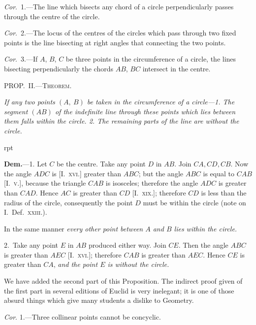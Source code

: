 \documentclass[oneside]{book}
\newcounter{wrapwidth}
\newcommand\mypropl[2]{
\bigskip\Needspace*{4\baselineskip}\begin{center}\textsc{#1}\end{center}
\hspace{\parindent}\emph{#2}\par\medskip
}
\newcommand\imgflow[3]{
\setcounter{wrapwidth}{#1}

\begin{wrapfigure}[#2]{r}{\value{wrapwidth}pt}
\begin{center}
\vspace{-0.3in}

\end{center}
\end{wrapfigure}
}
\begin{document}
\textit{Cor}.~1.---The line which bisects any chord of a circle
perpendicularly passes through the centre of the circle.

\textit{Cor}.~2.---The locus of the centres of the circles which
pass through two fixed points is the line bisecting at
right angles that connecting the two points.

\textit{Cor}.~3.---If $A$, $B$, $C$ be three points in the circumference
of a circle, the lines bisecting perpendicularly
the chords $AB$, $BC$ intersect in the centre.




\mypropl{PROP\@.~II\@.---Theorem.}{If any two points $(A,\ B)$ be taken in the circumference
of a circle---\textrm{1.} The segment $(AB)$ of the indefinite line
through these points which lies between them falls within
the circle. \textrm{2.} The remaining\label{remainiug} 
parts of the line are without
the circle.}


\imgflow{140}{9}{f105}

\textbf{Dem.}---1. Let $C$ be the centre. Take any point $D$
in $AB$. Join $CA, CD, CB$.
Now the angle $ADC$ is
[I.\ \textsc{xvi.}] greater than $ABC$;
but the angle $ABC$ is equal
to $CAB$ [I.\ \textsc{v.}], because the
triangle $CAB$ is isosceles;
therefore the angle $ADC$ is
greater than $CAD$. Hence
$AC$ is greater than $CD$ [I.\ \textsc{xix.}]; therefore $CD$ is less
than the radius of the circle, consequently the point $D$
must be within the circle (note on I.\ Def.\ \textsc{xxiii.}).

In the same manner \textit{every other point between $A$ and
$B$ lies within the circle.}\par\medskip

2.~Take any point $E$ in $AB$ produced either way.
Join $CE$. Then the angle $ABC$ is greater than $AEC$
[I.\ \textsc{xvi.}]; therefore $CAB$ is greater than $AEC$. Hence
$CE$ is greater than $CA$, \textit{and the point $E$ is without the
circle.}\par\medskip

\begin{footnotesize}
We have added the second part of this Proposition. The indirect
proof given of the first part in several editions of Euclid
is very inelegant; it is one of those absurd things which give
many students a dislike to Geometry.
\par\end{footnotesize}\medskip

\textit{Cor}. 1.---Three collinear points cannot be concyclic.\par\smallskip
\end{document}

